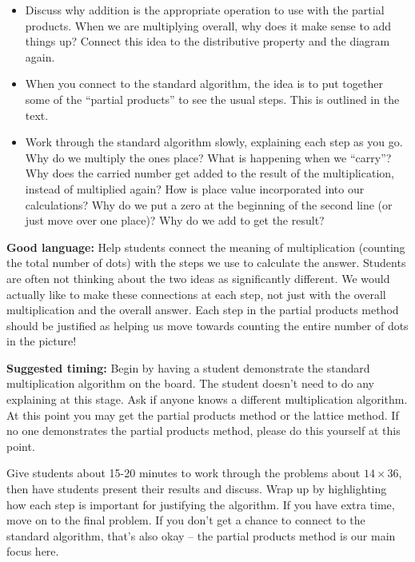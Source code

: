 \documentclass[nooutcomes,noauthor,handout]{ximera}
\begin{document}
\begin{instructorNotes}
\begin{itemize}
	\item Discuss why addition is the appropriate operation to use with the partial products. When we are multiplying overall, why does it make sense to add things up? Connect this idea to the distributive property and the diagram again.
	\item When you connect to the standard algorithm, the idea is to put together some of the ``partial products'' to see the usual steps. This is outlined in the text.
	\item Work through the standard algorithm slowly, explaining each step as you go. Why do we multiply the ones place? What is happening when we ``carry''? Why does the carried number get added to the result of the multiplication, instead of multiplied again? How is place value incorporated into our calculations? Why do we put a zero at the beginning of the second line (or just move over one place)? Why do we add to get the result?
\end{itemize}


{\bf Good language:}  Help students connect the meaning of multiplication (counting the total number of dots) with the steps we use to calculate the answer. Students are often not thinking about the two ideas as significantly different. We would actually like to make these connections at each step, not just with the overall multiplication and the overall answer. Each step in the partial products method should be justified as helping us move towards counting the entire number of dots in the picture!


{\bf Suggested timing:} Begin by having a student demonstrate the standard multiplication algorithm on the board. The student doesn't need to do any explaining at this stage. Ask if anyone knows a different multiplication algorithm. At this point you may get the partial products method or the lattice method. If no one demonstrates the partial products method, please do this yourself at this point.

Give students about 15-20 minutes to work through the problems about $14 \times 36$, then have students present their results and discuss. Wrap up by highlighting how each step is important for justifying the algorithm. If you have extra time, move on to the final problem. If you don't get a chance to connect to the standard algorithm, that's also okay -- the partial products method is our main focus here.




\end{instructorNotes}
\end{document}

